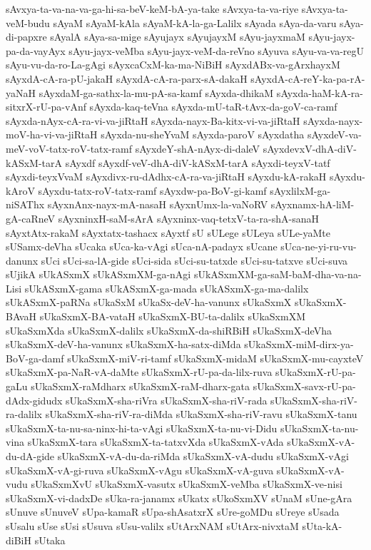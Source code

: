 {sAvxya-ta-va-na-va-ga-hi-sa-beV-keM-bA-ya-take
sAvxya-ta-va-riye
sAvxya-ta-veM-budu
sAyaM
sAyaM-kAla
sAyaM-kA-la-ga-Lalilx
sAyada
sAya-da-varu
sAya-di-papxre
sAyalA
sAya-sa-mige
sAyujayx
sAyujayxM
sAyu-jayxmaM
sAyu-jayx-pa-da-vayAyx
sAyu-jayx-veMba
sAyu-jayx-veM-da-reVno
sAyuva
sAyu-va-va-regU
sAyu-vu-da-ro-La-gAgi
sAyxcaCxM-ka-ma-NiBiH
sAyxdABx-va-gArxhayxM
sAyxdA-cA-ra-pU-jakaH
sAyxdA-cA-ra-parx-sA-dakaH
sAyxdA-cA-reY-ka-pa-rA-yaNaH
sAyxdaM-ga-sathx-la-mu-pA-sa-kamf
sAyxda-dhikaM
sAyxda-haM-kA-ra-sitxrX-rU-pa-vAnf
sAyxda-kaq-teVna
sAyxda-mU-taR-tAvx-da-goV-ca-ramf
sAyxda-nAyx-cA-ra-vi-va-jiRtaH
sAyxda-nayx-Ba-kitx-vi-va-jiRtaH
sAyxda-nayx-moV-ha-vi-va-jiRtaH
sAyxda-nu-sheYvaM
sAyxda-paroV
sAyxdatha
sAyxdeV-va-meV-voV-tatx-roV-tatx-ramf
sAyxdeY-shA-nAyx-di-daleV
sAyxdevxV-dhA-diV-kASxM-tarA
sAyxdf
sAyxdf-veV-dhA-diV-kASxM-tarA
sAyxdi-teyxV-tatf
sAyxdi-teyxVvaM
sAyxdivx-ru-dAdhx-cA-ra-va-jiRtaH
sAyxdu-kA-rakaH
sAyxdu-kAroV
sAyxdu-tatx-roV-tatx-ramf
sAyxdw-pa-BoV-gi-kamf
sAyxlilxM-ga-niSAThx
sAyxnAnx-nayx-mA-nasaH
sAyxnUmx-la-vaNoRV
sAyxnamx-hA-liM-gA-caRneV
sAyxninxH-saM-sArA
sAyxninx-vaq-tetxV-ta-ra-shA-sanaH
sAyxtAtx-rakaM
sAyxtatx-tashacx
sAyxtf
sU
sULege
sULeya
sULe-yaMte
sUSamx-deVha
sUcaka
sUca-ka-vAgi
sUca-nA-padayx
sUcane
sUca-ne-yi-ru-vu-danunx
sUci
sUci-sa-lA-gide
sUci-sida
sUci-su-tatxde
sUci-su-tatxve
sUci-suva
sUjikA
sUkASxmX
sUkASxmXM-ga-nAgi
sUkASxmXM-ga-saM-baM-dha-va-na-Lisi
sUkASxmX-gama
sUkASxmX-ga-mada
sUkASxmX-ga-ma-dalilx
sUkASxmX-paRNa
sUkaSxM
sUkaSx-deV-ha-vanunx
sUkaSxmX
sUkaSxmX-BAvaH
sUkaSxmX-BA-vataH
sUkaSxmX-BU-ta-dalilx
sUkaSxmXM
sUkaSxmXda
sUkaSxmX-dalilx
sUkaSxmX-da-shiRBiH
sUkaSxmX-deVha
sUkaSxmX-deV-ha-vanunx
sUkaSxmX-ha-satx-diMda
sUkaSxmX-miM-dirx-ya-BoV-ga-damf
sUkaSxmX-miV-ri-tamf
sUkaSxmX-midaM
sUkaSxmX-mu-cayxteV
sUkaSxmX-pa-NaR-vA-daMte
sUkaSxmX-rU-pa-da-lilx-ruva
sUkaSxmX-rU-pa-gaLu
sUkaSxmX-raMdharx
sUkaSxmX-raM-dharx-gata
sUkaSxmX-savx-rU-pa-dAdx-gidudx
sUkaSxmX-sha-riVra
sUkaSxmX-sha-riV-rada
sUkaSxmX-sha-riV-ra-dalilx
sUkaSxmX-sha-riV-ra-diMda
sUkaSxmX-sha-riV-ravu
sUkaSxmX-tanu
sUkaSxmX-ta-nu-sa-ninx-hi-ta-vAgi
sUkaSxmX-ta-nu-vi-Didu
sUkaSxmX-ta-nu-vina
sUkaSxmX-tara
sUkaSxmX-ta-tatxvXda
sUkaSxmX-vAda
sUkaSxmX-vA-du-dA-gide
sUkaSxmX-vA-du-da-riMda
sUkaSxmX-vA-dudu
sUkaSxmX-vAgi
sUkaSxmX-vA-gi-ruva
sUkaSxmX-vAgu
sUkaSxmX-vA-guva
sUkaSxmX-vA-vudu
sUkaSxmXvU
sUkaSxmX-vasutx
sUkaSxmX-veMba
sUkaSxmX-ve-nisi
sUkaSxmX-vi-dadxDe
sUka-ra-janamx
sUkatx
sUkoSxmXV
sUnaM
sUne-gAra
sUnuve
sUnuveV
sUpa-kamaR
sUpa-shAsatxrX
sUre-goMDu
sUreye
sUsada
sUsalu
sUse
sUsi
sUsuva
sUsu-valilx
sUtArxNAM
sUtArx-nivxtaM
sUta-kA-diBiH
sUtaka
}
